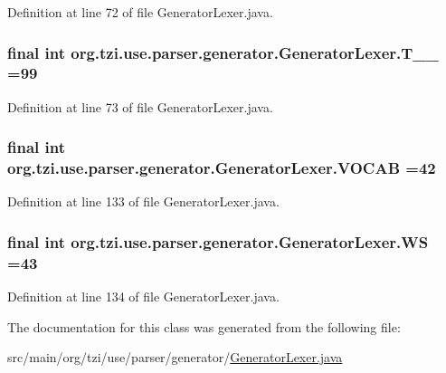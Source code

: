 Definition at line 72 of file Generator\-Lexer.\-java.

\hypertarget{classorg_1_1tzi_1_1use_1_1parser_1_1generator_1_1_generator_lexer_a9a5309bf367459e7156042da437a6e57}{
\subsubsection[{T\-\_\-\-\_\-99}]{\setlength{\rightskip}{0pt plus 5cm}final int org.\-tzi.\-use.\-parser.\-generator.\-Generator\-Lexer.\-T\-\_\-\-\_ =99\hspace{0.3cm}{\ttfamily [static]}}}\label{classorg_1_1tzi_1_1use_1_1parser_1_1generator_1_1_generator_lexer_a9a5309bf367459e7156042da437a6e57}


Definition at line 73 of file Generator\-Lexer.\-java.

\hypertarget{classorg_1_1tzi_1_1use_1_1parser_1_1generator_1_1_generator_lexer_acdece40d1b9fc90ca67f160d650926db}{
\subsubsection[{V\-O\-C\-A\-B}]{\setlength{\rightskip}{0pt plus 5cm}final int org.\-tzi.\-use.\-parser.\-generator.\-Generator\-Lexer.\-V\-O\-C\-A\-B =42\hspace{0.3cm}{\ttfamily [static]}}}\label{classorg_1_1tzi_1_1use_1_1parser_1_1generator_1_1_generator_lexer_acdece40d1b9fc90ca67f160d650926db}


Definition at line 133 of file Generator\-Lexer.\-java.

\hypertarget{classorg_1_1tzi_1_1use_1_1parser_1_1generator_1_1_generator_lexer_ae3e71e28e143f018c22e986180211417}{
\subsubsection[{W\-S}]{\setlength{\rightskip}{0pt plus 5cm}final int org.\-tzi.\-use.\-parser.\-generator.\-Generator\-Lexer.\-W\-S =43\hspace{0.3cm}{\ttfamily [static]}}}\label{classorg_1_1tzi_1_1use_1_1parser_1_1generator_1_1_generator_lexer_ae3e71e28e143f018c22e986180211417}


Definition at line 134 of file Generator\-Lexer.\-java.



The documentation for this class was generated from the following file\-:\begin{DoxyCompactItemize}
\item 
src/main/org/tzi/use/parser/generator/\hyperlink{_generator_lexer_8java}{Generator\-Lexer.\-java}\end{DoxyCompactItemize}

